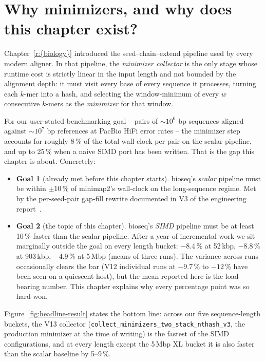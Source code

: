 \section{Why minimizers, and why does this chapter exist?}
\label{sec:why-minimizers}

Chapter~\ref{r:{biology}} introduced the seed--chain--extend
pipeline used by every modern aligner.  In that pipeline, the
\emph{minimizer collector} is the only stage whose runtime cost is
strictly linear in the input length and not bounded by the alignment
depth: it must visit every base of every sequence it processes,
turning each $k$-mer into a hash, and selecting the
window-minimum of every $w$ consecutive $k$-mers as the
\emph{minimizer} for that window.

For our user-stated benchmarking goal -- pairs of ${\sim}10^6$ bp
sequences aligned against ${\sim}10^7$ bp references at PacBio HiFi
error rates -- the minimizer step accounts for roughly 8\,\% of the
total wall-clock per pair on the scalar pipeline, and up to 25\,\%
when a naive SIMD port has been written. That is the gap this
chapter is about.  Concretely:

\begin{itemize}
\item \textbf{Goal 1} (already met before this chapter starts).
  bioseq's \emph{scalar} pipeline must be within $\pm 10\,\%$ of
  minimap2's wall-clock on the long-sequence regime.  Met by the
  per-seed-pair gap-fill rewrite documented in V3 of the engineering
  report~\cite{bioseq_eng_report_v1}.
\item \textbf{Goal 2} (the topic of this chapter).
  bioseq's \emph{SIMD} pipeline must be at least 10\,\% faster than
  the scalar pipeline.  After a year of incremental work we sit
  marginally outside the goal on every length bucket: $-8.4\,\%$ at
  52\,kbp, $-8.8\,\%$ at 903\,kbp, $-4.9\,\%$ at 5\,Mbp (means of three
  runs).  The variance across runs occasionally clears the bar (V12
  individual runs at $-9.7\,\%$ to $-12\,\%$ have been seen on a
  quiescent host), but the mean reported here is the load-bearing
  number.  This chapter explains why every percentage point was so
  hard-won.
\end{itemize}

Figure~\ref{fig:headline-result} states the bottom line: across our
five sequence-length buckets, the V13 collector
(\texttt{collect\_minimizers\_two\_stack\_nthash\_v3}, the
production minimizer at the time of writing) is the fastest of the
SIMD configurations, and at every length except the 5\,Mbp XL bucket
it is also faster than the scalar baseline by 5--9\,\%.

